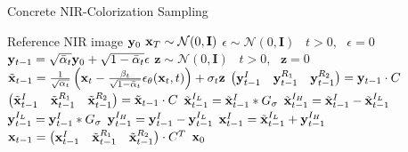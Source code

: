 \begin{algorithm}[htp!]
   \caption{Concrete NIR-Colorization Sampling}
   \label{alg:sampling-nir-colorization-concrete}
   \begin{algorithmic}
      \Require Reference NIR image $\mathbf{y}_0$
      \State $\mathbf{x}_T \sim \mathcal{N}(0, \mathbf{I})$
      \State $\epsilon \sim \mathcal{N}(0, \mathbf{I})$ \algorithmicif\ $t > 0$, \algorithmicelse\ $\epsilon = 0$
      \State $\mathbf{y}_{t-1} = \sqrt{\bar{\alpha}_t}\mathbf{y}_{0} + \sqrt{1 - \bar{\alpha}_t} \epsilon$
      \State $\mathbf{z} \sim \mathcal{N}(0, \mathbf{I})$ \algorithmicif\ $t > 0$, \algorithmicelse\ $\mathbf{z} = 0$
      \State $\tilde{\mathbf{x}}_{t-1} = \frac{1}{\sqrt{\alpha_t}} \left(\mathbf{x}_t - \frac{\beta_t}{\sqrt{1 - \bar{\alpha}_t}} \epsilon_\theta(\mathbf{x}_t, t) \right) + \sigma_t \mathbf{z}$
      \State $\begin{pmatrix}\mathbf{y}_{t-1}^I & \mathbf{y}_{t-1}^{R_1} & \mathbf{y}_{t-1}^{R_2}\end{pmatrix} = \mathbf{y}_{t-1} \cdot C$
      \State $\begin{pmatrix}\tilde{\mathbf{x}}_{t-1}^I & \tilde{\mathbf{x}}_{t-1}^{R_1} & \tilde{\mathbf{x}}_{t-1}^{R_2}\end{pmatrix} = \tilde{\mathbf{x}}_{t-1} \cdot C$
      \State $\tilde{\mathbf{x}}_{t-1}^{I_L} = \tilde{\mathbf{x}}_{t-1}^I * G_\sigma$
      \State $\tilde{\mathbf{x}}_{t-1}^{I_H} = \tilde{\mathbf{x}}_{t-1}^I - \tilde{\mathbf{x}}_{t-1}^{I_L}$
      \State $\mathbf{y}_{t-1}^{I_L} = \mathbf{y}_{t-1}^{I} * G_\sigma$
      \State $\mathbf{y}_{t-1}^{I_H} = \mathbf{y}_{t-1}^{I} - \mathbf{y}_{t-1}^{I_L}$
      \State $\mathbf{x}_{t-1}^I = \tilde{\mathbf{x}}_{t-1}^{I_L} + \mathbf{y}_{t-1}^{I_H}$
      \State $\mathbf{x}_{t-1} = \begin{pmatrix}\mathbf{x}_{t-1}^I & \tilde{\mathbf{x}}_{t-1}^{R_1} & \tilde{\mathbf{x}}_{t-1}^{R_2} \end{pmatrix} \cdot C^T$
      \EndFor
      \Return $\mathbf{x}_0$
   \end{algorithmic}
\end{algorithm}

